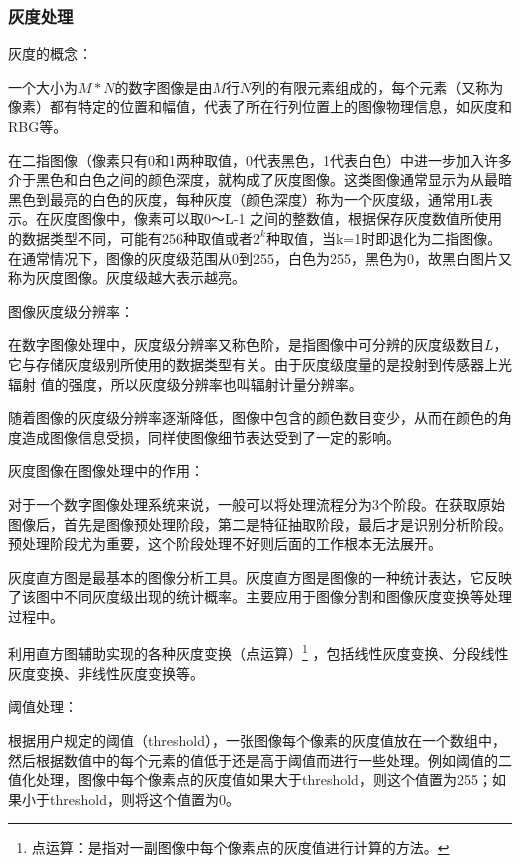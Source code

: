 \subsubsection{灰度处理}
灰度的概念：

一个大小为$M * N$的数字图像是由$M$行$N$列的有限元素组成的，每个元素（又称为像素）都有特定的位置和幅值，代表了所在行列位置上的图像物理信息，如灰度和RBG等。

在二指图像（像素只有0和1两种取值，0代表黑色，1代表白色）中进一步加入许多介于黑色和白色之间的颜色深度，就构成了灰度图像。这类图像通常显示为从最暗黑色到最亮的白色的灰度，每种灰度（颜色深度）称为一个灰度级，通常用L表示。在灰度图像中，像素可以取0～L-1
之间的整数值，根据保存灰度数值所使用的数据类型不同，可能有256种取值或者$2^k$种取值，当k=1时即退化为二指图像。在通常情况下，图像的灰度级范围从0到255，白色为255，黑色为0，故黑白图片又称为灰度图像。灰度级越大表示越亮。

图像灰度级分辨率：

在数字图像处理中，灰度级分辨率又称色阶，是指图像中可分辨的灰度级数目$L$，
它与存储灰度级别所使用的数据类型有关。由于灰度级度量的是投射到传感器上光辐射
值的强度，所以灰度级分辨率也叫辐射计量分辨率。

随着图像的灰度级分辨率逐渐降低，图像中包含的颜色数目变少，从而在颜色的角
度造成图像信息受损，同样使图像细节表达受到了一定的影响。

灰度图像在图像处理中的作用：

对于一个数字图像处理系统来说，一般可以将处理流程分为3个阶段。在获取原始图像后，首先是图像预处理阶段，第二是特征抽取阶段，最后才是识别分析阶段。预处理阶段尤为重要，这个阶段处理不好则后面的工作根本无法展开。

灰度直方图是最基本的图像分析工具。灰度直方图是图像的一种统计表达，它反映了该图中不同灰度级出现的统计概率。主要应用于图像分割和图像灰度变换等处理过程中。

利用直方图辅助实现的各种灰度变换（点运算）\footnote{点运算：是指对一副图像中每个像素点的灰度值进行计算的方法。}
，包括线性灰度变换、分段线性灰度变换、非线性灰度变换等。

阈值处理：

根据用户规定的阈值（threshold），一张图像每个像素的灰度值放在一个数组中，然后根据数值中的每个元素的值低于还是高于阈值而进行一些处理。例如阈值的二值化处理，图像中每个像素点的灰度值如果大于threshold，则这个值置为255；如果小于threshold，则将这个值置为0。

